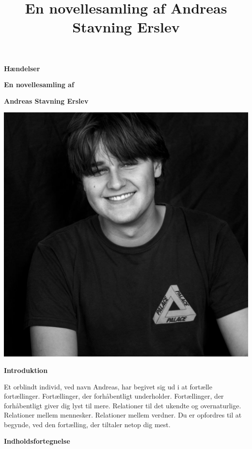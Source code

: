 \documentclass[]{article}
\title{En novellesamling \newline af Andreas Stavning Erslev}
\begin{document}
	
\begin{center}
	\huge\textbf{Hændelser}
\end{center}

\begin{center}
	\Large\textbf{En novellesamling af}
\end{center}

\begin{center}
	\LARGE\textbf{Andreas Stavning Erslev}
\end{center}

\includegraphics[width=\textwidth]{pb}

\begin{center}
	\large\textbf{Introduktion}
\end{center}

Et orblindt individ, ved navn Andreas, har begivet sig ud i at fortælle fortællinger. Fortællinger, der forhåbentligt underholder. Fortællinger, der forhåbentligt giver dig lyst til mere. Relationer til det ukendte og overnaturlige. Relationer mellem mennesker. Relationer mellem verdner. \newline
Du er opfordres til at begynde, ved den fortælling, der tiltaler netop dig mest.

\newpage

\begin{center}
	\LARGE\textbf{Indholdsfortegnelse}
\end{center}
\end{document}

